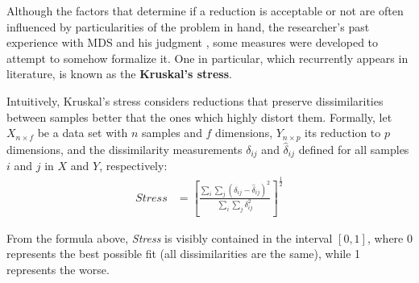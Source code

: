 Although the factors that determine if a reduction is acceptable or not are often influenced by particularities of the problem in hand, the researcher's past experience with MDS and his judgment \cite{naes1996multivariate}, some measures were developed to attempt to somehow formalize it. One in particular, which recurrently appears in literature, is known as the \textbf{Kruskal's stress}.

Intuitively, Kruskal's stress \cite{naes1996multivariate} considers reductions that preserve dissimilarities between samples better that the ones which highly distort them. Formally, let $X_{n \times f}$ be a data set with $n$ samples and $f$ dimensions, $Y_{n \times p}$ its reduction to $p$ dimensions, and the dissimilarity measurements $\delta_{ij}$ and $\hat{\delta}_{ij}$ defined for all samples $i$ and $j$ in $X$ and $Y$, respectively:
\begin{align*}
	Stress &= [\frac{\sum_i \sum_j (\delta_{ij} - \hat{\delta}_{ij})^2}{\sum_i \sum_j \delta_{ij}^2}]^{\frac{1}{2}}
\end{align*}

From the formula above, {\em Stress} is visibly contained in the interval $[0, 1]$, where 0 represents the best possible fit (all dissimilarities are the same), while 1 represents the worse.
